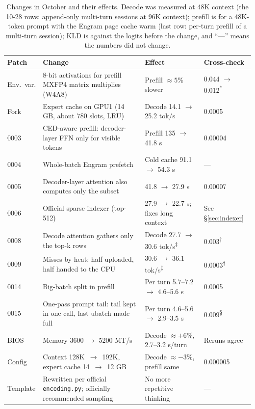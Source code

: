 \documentclass[11pt,a4paper]{article}
\newcommand{\code}[1]{\texttt{#1}}
\newcommand{\tps}{tok/s}
\begin{document}
\begin{table}[!tp]
  \centering
  \small
  \caption{Changes in October and their effects. Decode was measured at 48K context (the 10-28 rows: append-only multi-turn sessions at 96K context); prefill is for a 48K-token prompt with the Engram page cache warm (last row: per-turn prefill of a multi-turn session); KLD is against the logits before the change, and ``---'' means the numbers did not change.}
  \label{tab:summary}
  \begin{tabularx}{\textwidth}{@{}l X l l@{}}
    \toprule
    Patch & Change & Effect & Cross-check \\
    \midrule
    Env.\ var. & 8-bit activations for prefill MXFP4 matrix multiplies (W4A8) & Prefill $\approx 5$\% slower & 0.044 $\to$ 0.012\textsuperscript{*} \\
    Fork & Expert cache on GPU1 (14 GB, about 780 slots, LRU) & Decode 14.1 $\to$ 25.2 \tps{} & 0.0005 \\
    0003 & CED-aware prefill: decoder-layer FFN only for visible tokens & Prefill 135 $\to$ 41.8 s & 0.00004 \\
    0004 & Whole-batch Engram prefetch & Cold cache 91.1 $\to$ 54.3 s & --- \\
    0005 & Decoder-layer attention also computes only the subset & 41.8 $\to$ 27.9 s & 0.00007 \\
    0006 & Official sparse indexer (top-512) & 27.9 $\to$ 22.7 s; fixes long context & See \S\ref{sec:indexer} \\
    0008 & Decode attention gathers only the top-k rows & Decode 27.7 $\to$ 30.6 \tps{}\textsuperscript{‡} & 0.003\textsuperscript{†} \\
    0009 & Misses by heat: half uploaded, half handed to the CPU & 30.6 $\to$ 36.1 \tps{}\textsuperscript{‡} & 0.0003\textsuperscript{†} \\
    0014 & Big-batch split in prefill & Per turn 5.7--7.2 $\to$ 4.6--5.6 s & 0.0005 \\
    0015 & One-pass prompt tail: tail kept in one call, last ubatch made full & Per turn 4.6--5.6 $\to$ 2.9--3.5 s & 0.009\textsuperscript{§} \\
    BIOS & Memory 3600 $\to$ 5200 MT/s & Decode $\approx +6$\%, 2.7--3.2 s/turn & Reruns agree \\
    Config & Context 128K~$\to$~192K, expert cache 14~$\to$~12 GB & Decode $\approx -3$\%, prefill same & 0.000005 \\
    Template & Rewritten per official \code{encoding.py}; officially recommended sampling & No more repetitive thinking & --- \\

\end{tabularx}
\end{table}
\end{document}

